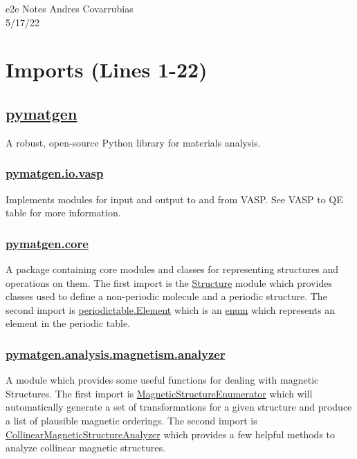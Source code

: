 \documentclass[12pt]{article}
\begin{document}
\noindent e2e Notes \hfill Andres Covarrubias    \\
5/17/22

\hrulefill
\section*{Imports (Lines 1-22)}
\subsection*{\href{https://pymatgen.org/}{pymatgen}}
A robust, open-source Python library for materials analysis.

    \subsubsection*{\href{https://pymatgen.org/pymatgen.io.vasp.html?highlight=io\%20vasp\#module-pymatgen.io.vasp}{pymatgen.io.vasp}} Implements modules for input and output to and from VASP. See VASP to QE table for more information. 
    
    \subsubsection*{\href{https://pymatgen.org/pymatgen.core.html}{pymatgen.core}} A package containing core modules and classes for representing structures and operations on them. The first import is the \href{https://pymatgen.org/pymatgen.core.structure.html?highlight=structure#module-pymatgen.core.structure}{Structure} module which provides classes used to define a non-periodic molecule and a periodic structure. The second import is \href{https://pymatgen.org/pymatgen.core.periodic_table.html?highlight=element#pymatgen.core.periodic_table.Element}{periodic\textunderscore table.Element} which is an \href{https://docs.python.org/3/library/enum.html}{enum} which represents an element in the periodic table. 
    
    \subsubsection*{\href{https://pymatgen.org/pymatgen.analysis.magnetism.analyzer.html}{pymatgen.analysis.magnetism.analyzer}} A module which provides some useful functions for dealing with magnetic Structures. The first import is  \href{https://pymatgen.org/pymatgen.analysis.magnetism.analyzer.html?highlight=magneticstructureenumerator#pymatgen.analysis.magnetism.analyzer.MagneticStructureEnumerator}{MagneticStructureEnumerator} which will automatically generate a set of transformations for a given structure and produce a list of plausible magnetic orderings. The second import is \href{https://pymatgen.org/pymatgen.analysis.magnetism.analyzer.html?highlight=collinearmagneticstructureanalyzer#pymatgen.analysis.magnetism.analyzer.CollinearMagneticStructureAnalyzer}{CollinearMagneticStructureAnalyzer} which provides a few helpful methods to analyze collinear magnetic structures.
\end{document}
